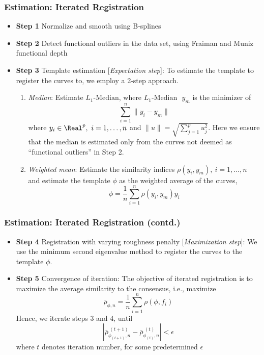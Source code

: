 \documentclass[10pt,dvipsnames,table]{beamer}
\begin{document}
\begin{frame}
\frametitle{Estimation: Iterated Registration}
\begin{itemize}
\item {\bf{Step 1}} Normalize and smooth using B-splines
\item {\bf{Step 2}} Detect functional outliers in the data set, using Fraiman and Muniz functional depth
\item {\bf{Step 3}} Template estimation [{\emph{Expectation step}}]: To estimate the template to register the curves to, we employ a 2-step approach. 
\begin{enumerate}
\item {\emph{Median}}: Estimate $L_1\text{-Median}$, where $L_1\text{-Median }$ $y_m$ is the minimizer of 
\[ \sum\limits_{i = 1}^n \|y_i - y_m \| \]
where $y_i \in \Real^p, \ i = 1,\dots,n$ and $\|u \| = \sqrt{\sum\limits_{j = 1}^p u_j^2}$. Here we ensure that the median is estimated only from the curves not deemed as ``functional outliers'' in Step 2. 
\item {\emph{Weighted mean}}: Estimate the similarity indices $\rho(y_i, y_m), \ i = 1,\dots,n$ and estimate the template $\phi$ as the weighted average of the curves, 
\[ \phi = \frac{1}{n}\sum\limits_{i = 1}^n \rho(y_i, y_m) y_i \]
\end{enumerate}
\end{itemize}
\end{frame}

\begin{frame}
\frametitle{Estimation: Iterated Registration (contd.)}
\begin{itemize}
\item {\bf{Step 4}} Registration with varying roughness penalty [{\emph{Maximization step}}]: We use the minimum second eigenvalue method to register the curves to the template $\phi$. 
\item {\bf{Step 5}} Convergence of iteration: The objective of iterated registration is to maximize the average similarity to the consensus, i.e., maximize 
\[ \bar{\rho}_{\phi, n} = \frac{1}{n} \sum \limits_{i = 1}^{n} \rho(\phi, f_i)\]
Hence, we iterate steps 3 and 4, until
\[ |\bar{\rho}_{\phi_{(t+1)}, n}^{\ (t+1)} - \bar{\rho}_{\phi_{(t)}, n}^{ \ (t)} | < \epsilon \]
where $t$ denotes iteration number, for some predetermined $\epsilon$
\end{itemize}
\end{frame}
\end{document}
